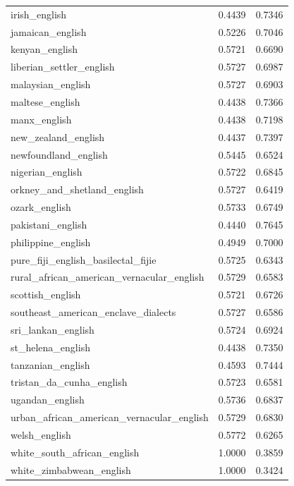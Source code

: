 \begin{landscape}
\begin{longtable}{lcc}
irish\_english & 0.4439 & 0.7346 \\
jamaican\_english & 0.5226 & 0.7046 \\
kenyan\_english & 0.5721 & 0.6690 \\
liberian\_settler\_english & 0.5727 & 0.6987 \\
malaysian\_english & 0.5727 & 0.6903 \\
maltese\_english & 0.4438 & 0.7366 \\
manx\_english & 0.4438 & 0.7198 \\
new\_zealand\_english & 0.4437 & 0.7397 \\
newfoundland\_english & 0.5445 & 0.6524 \\
nigerian\_english & 0.5722 & 0.6845 \\
orkney\_and\_shetland\_english & 0.5727 & 0.6419 \\
ozark\_english & 0.5733 & 0.6749 \\
pakistani\_english & 0.4440 & 0.7645 \\
philippine\_english & 0.4949 & 0.7000 \\
pure\_fiji\_english\_basilectal\_fijie & 0.5725 & 0.6343 \\
rural\_african\_american\_vernacular\_english & 0.5729 & 0.6583 \\
scottish\_english & 0.5721 & 0.6726 \\
southeast\_american\_enclave\_dialects & 0.5727 & 0.6586 \\
sri\_lankan\_english & 0.5724 & 0.6924 \\
st\_helena\_english & 0.4438 & 0.7350 \\
tanzanian\_english & 0.4593 & 0.7444 \\
tristan\_da\_cunha\_english & 0.5723 & 0.6581 \\
ugandan\_english & 0.5736 & 0.6837 \\
urban\_african\_american\_vernacular\_english & 0.5729 & 0.6830 \\
welsh\_english & 0.5772 & 0.6265 \\
white\_south\_african\_english & 1.0000 & 0.3859 \\
white\_zimbabwean\_english & 1.0000 & 0.3424 \\
\bottomrule
\end{longtable}
\end{landscape}